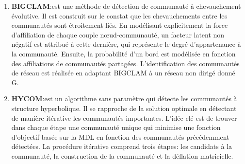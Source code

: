 \begin{enumerate}
				\item \textbf{BIGCLAM\citep{yang2013overlapping}}:est une méthode de détection de communauté à chevauchement évolutive. Il est construit sur le constat que les chevauchements entre les communautés sont étroitement liés. En modélisant explicitement la force d’affiliation de chaque couple nœud-communauté, un facteur latent non négatif est attribué à cette dernière, qui représente le degré d'appartenance à la communauté. Ensuite, la probabilité d'un bord est modélisée en fonction des affiliations de communautés partagées. L’identification des communautés de réseau est réalisée en adaptant BIGCLAM à un réseau non dirigé donné G.
				\item \textbf{HYCOM\citep{araujo2014beyond}}:est un algorithme sans paramètre qui détecte les communautés à structure hyperbolique. Il se rapproche de la solution optimale en détectant de manière itérative les communautés importantes. L'idée clé est de trouver dans chaque étape une communauté unique qui minimise une fonction d'objectif basée sur la MDL en fonction des communautés précédemment détectées. La procédure itérative comprend trois étapes: les candidats à la communauté, la construction de la communauté et la déflation matricielle.
				
			\end{enumerate}
			
